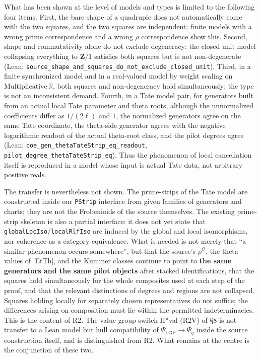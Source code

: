 \documentclass[11pt]{article}
\begin{document}
What has been shown at the level of models and types is limited to
the following four items.  First, the bare shape of a quadruple
does not automatically come with the two squares, and the two
squares are independent; finite models with a wrong prime
correspondence and a wrong $\rho$ correspondence show this.  Second,
shape and commutativity alone do not exclude degeneracy: the closed
unit model collapsing everything to $\mathbf{Z}/1$ satisfies both
squares but is not non-degenerate (Lean:
\texttt{source\_shape\_and\_squares\_do\_not\_exclude\_closed\_unit}).
Third, in a finite synchronized model and in a real-valued model by
weight scaling on $\mathrm{Multiplicative}\,\mathbb R$, both squares
and non-degeneracy hold simultaneously; the type is not an
inconsistent demand.  Fourth, in a Tate model pair, for generators
built from an actual local Tate parameter and theta roots, although
the unnormalized coefficients differ as $1/(2\ell)$ and $1$, the
normalized generators agree on the same Tate coordinate, the
theta-side generator agrees with the negative logarithmic readout of
the actual theta-root class, and the pilot degrees agree (Lean:
\texttt{coe\_gen\_thetaTateStrip\_eq\_readout},
\texttt{pilot\_degree\_thetaTateStrip\_eq}).  Thus the phenomenon
of local cancellation itself is reproduced in a model whose input
is actual Tate data, not arbitrary positive reals.

The transfer is nevertheless not shown.  The prime-strips of the
Tate model are constructed inside our \texttt{PStrip} interface from
given families of generators and charts; they are not the
Frobenioids of the source themselves.  The existing prime-strip
skeleton is also a partial interface: it does not yet state that
\texttt{globalLocIso}/\texttt{localRlfIso} are induced by the global
and local isomorphisms, nor coherence as a category equivalence.
What is needed is not merely that ``a similar phenomenon occurs
somewhere'', but that the source's $\rho^{\Theta}$, the theta values
of [EtTh], and the Kummer classes continue to point to \textbf{the
same generators and the same pilot objects} after stacked
identifications, that the squares hold simultaneously for the whole
composites used at each step of the proof, and that the relevant
distinctions of degrees and regions are not collapsed.  Squares
holding locally for separately chosen representatives do not
suffice; the differences arising on composition must lie within the
permitted indeterminacies.  This is the content of R2.  The
value-group switch H*val (R2V) of \S8 is not transfer to a Lean
model but hull compatibility of
$\Psi_{\mathrm{LGP}}\to\Psi_q$ inside the source construction
itself, and is distinguished from R2.  What remains at the centre
is the conjunction of these two.
\end{document}
